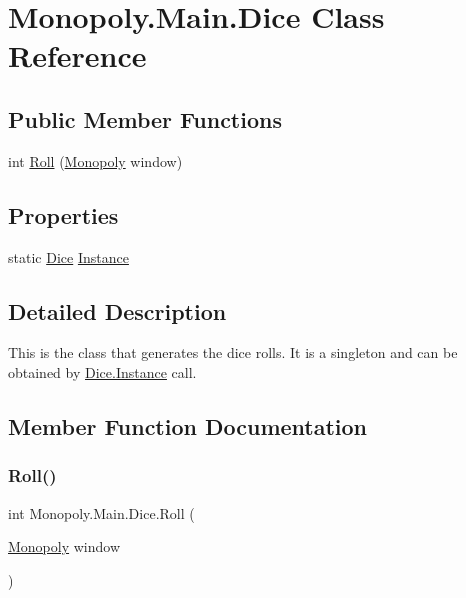 \hypertarget{class_monopoly_1_1_main_1_1_dice}{}\section{Monopoly.\+Main.\+Dice Class Reference}
\label{class_monopoly_1_1_main_1_1_dice}
\subsection*{Public Member Functions}
\begin{DoxyCompactItemize}
\item 
int \mbox{\hyperlink{class_monopoly_1_1_main_1_1_dice_a45e963f957827aadeffc413417b8b586}{Roll}} (\mbox{\hyperlink{class_monopoly_1_1_main_1_1_monopoly}{Monopoly}} window)
\end{DoxyCompactItemize}
\subsection*{Properties}
\begin{DoxyCompactItemize}
\item 
static \mbox{\hyperlink{class_monopoly_1_1_main_1_1_dice}{Dice}} \mbox{\hyperlink{class_monopoly_1_1_main_1_1_dice_ae4123f0a19934c8b5abb5e440787fe6f}{Instance}}
\end{DoxyCompactItemize}


\subsection{Detailed Description}
This is the class that generates the dice rolls. It is a singleton and can be obtained by \mbox{\hyperlink{class_monopoly_1_1_main_1_1_dice_ae4123f0a19934c8b5abb5e440787fe6f}{Dice.\+Instance}} call. 

\subsection{Member Function Documentation}
\mbox{\label{class_monopoly_1_1_main_1_1_dice_a45e963f957827aadeffc413417b8b586}} 
\subsubsection{\texorpdfstring{Roll()}{Roll()}}
{\footnotesize\ttfamily int Monopoly.\+Main.\+Dice.\+Roll (\begin{DoxyParamCaption}\item[{\mbox{\hyperlink{class_monopoly_1_1_main_1_1_monopoly}{Monopoly}}}]{window }\end{DoxyParamCaption})\hspace{0.3cm}{\ttfamily [inline]}}

